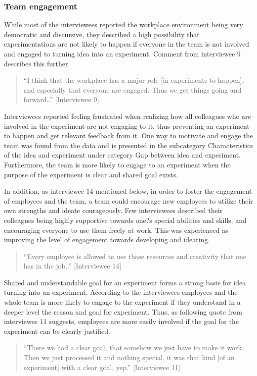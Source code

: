 \subsubsection{Team engagement}
While most of the interviewees reported the workplace environment being very democratic and discursive, they described a high possibility that experimentations are not likely to happen if everyone in the team is not involved and engaged to turning idea into an experiment. Comment from interviewee 9 describes this further.
\begin{quote}
 ``I think that the workplace has a major role [in experiments to happen], and especially that everyone are engaged. Thus we get things going and forward..'' [Interviewee 9]
\end{quote}
Interviewees reported feeling frustrated when realizing how all colleagues who are involved in the experiment are not engaging to it, thus preventing an experiment to happen and get relevant feedback from it. One way to motivate and engage the team was found from the data and is presented in the subcategory Characteristics of the idea and experiment under category Gap between idea and experiment. Furthermore, the team is more likely to engage to an experiment when the purpose of the experiment is clear and shared goal exists.  

In addition, as interviewee 14 mentioned below, in order to foster the engagement of employees and the team, a team could encourage new employees to utilize their own strengths and ideate courageously. Few interviewees described their colleagues being highly supportive towards one?s special abilities and skills, and encouraging everyone to use them freely at work. This was experienced as improving the level of engagement towards developing and ideating.
\begin{quote}
``Every employee is allowed to use those resources and creativity that one has in the job..'' [Interviewee 14]
\end{quote}
Shared and understandable goal for an experiment forms a strong basis for idea turning into an experiment. According to the interviewees employees and the whole team is more likely to engage to the experiment if they understand in a deeper level the reason and goal for experiment. Thus, as following quote from interviewee 11 suggests, employees are more easily involved if the goal for the experiment can be clearly justified. 
\begin{quote}
``There we had a clear goal, that somehow we just have to make it work. Then we just processed it and nothing special, it was that kind [of an experiment] with a clear goal, yep.'' [Interviewee 11]
\end{quote}

